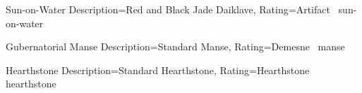 ﻿


\begin{Merit}{Sun-on-Water}{%
    Description={Red and Black Jade Daiklave},
    Rating=Artifact~
}{sun-on-water}
    \TBW


\end{Merit}



\begin{Merit}{Gubernatorial Manse}{%
    Description={Standard Manse},
    Rating=Demesne~
}{manse}
    \TBW
\end{Merit}



\begin{Merit}{Hearthstone}{%
    Description={Standard Hearthstone},
    Rating=Hearthstone~
}{hearthstone}
    \TBW
\end{Merit}


\printbibliography[title=References]


